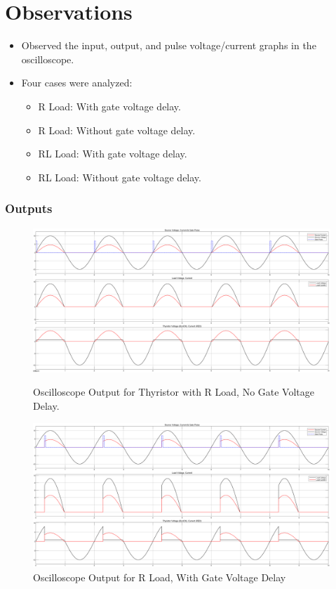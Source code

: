 \documentclass[12pt]{article}
\begin{document}
\section*{Observations}
\begin{itemize}
    \item Observed the input, output, and pulse voltage/current graphs in the oscilloscope.
    \item Four cases were analyzed:
          \begin{itemize}
              \item R Load: With gate voltage delay.
              \item R Load: Without gate voltage delay.
              \item RL Load: With gate voltage delay.
              \item RL Load: Without gate voltage delay.
          \end{itemize}
\end{itemize}

\subsubsection*{Outputs}
\begin{figure}[H]
    \centering
    \includegraphics[width=\textwidth]{r.png}
    \caption{}
    Oscilloscope Output for Thyristor with R Load, No Gate Voltage Delay.
    \label{fig:rLoad}
\end{figure}

\begin{figure}[H]
    \centering
    \includegraphics[width=\textwidth]{r_delay.png}
    \caption{Oscilloscope Output for R Load, With Gate Voltage Delay}
    \label{fig:rLoadDelay}
\end{figure}
\end{document}
